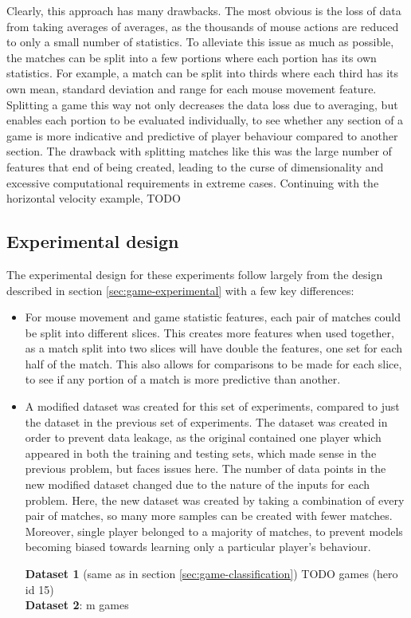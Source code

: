 \documentclass[Report.tex]{subfiles}
\begin{document}
Clearly, this approach has many drawbacks. The most obvious is the loss of data from taking averages of averages, as the thousands of mouse actions are reduced to only a small number of statistics. To alleviate this issue as much as possible, the matches can be split into a few portions where each portion has its own statistics. For example, a match can be split into thirds where each third has its own mean, standard deviation and range for each mouse movement feature. Splitting a game this way not only decreases the data loss due to averaging, but enables each portion to be evaluated individually, to see whether any section of a game is more indicative and predictive of player behaviour compared to another section. The drawback with splitting matches like this was the large number of features that end of being created, leading to the curse of dimensionality and excessive computational requirements in extreme cases. Continuing with the horizontal velocity example, TODO

\subsection{Experimental design}
The experimental design for these experiments follow largely from the design described in section \ref{sec:game-experimental} with a few key differences:
\begin{itemize}
\item For mouse movement and game statistic features, each pair of matches could be split into different slices. This creates more features when used together, as a match split into two slices will have double the features, one set for each half of the match. This also allows for comparisons to be made for each slice, to see if any portion of a match is more predictive than another. 
\item A modified dataset was created for this set of experiments, compared to just the dataset in the previous set of experiments. The dataset was created in order to prevent data leakage, as the original contained one player which appeared in both the training and testing sets, which made sense in the previous problem, but faces issues here. The number of data points in the new modified dataset changed due to the nature of the inputs for each problem. Here, the new dataset was created by taking a combination of every pair of matches, so many more samples can be created with fewer matches. Moreover, single player belonged to a majority of matches, to prevent models becoming biased towards learning only a particular player's behaviour.

\textbf{Dataset 1} (same as in section \ref{sec:game-classification}) TODO games (hero id 15) \\
\textbf{Dataset 2}: m games
\end{itemize}
\end{document}

